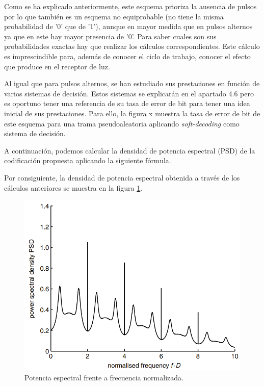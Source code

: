 Como se ha explicado anteriormente, este esquema prioriza la ausencia de pulsos por
lo que también es un esquema no equiprobable (no tiene la misma probabilidad de '0'
que de '1'), aunque en mayor medida que en pulsos
alternos ya que en este hay mayor presencia de '0'. Para saber cuales son sus 
probabilidades exactas hay que realizar los cálculos correspondientes. Este cálculo es 
imprescindible para, además de conocer el ciclo de trabajo, conocer el efecto que 
produce en el receptor de luz.

Al igual que para pulsos alternos, se han estudiado sus prestaciones en función de varios 
sistemas de decisión. Estos sistemas se explicarán en el apartado 4.6 pero es oportuno 
tener una referencia de su tasa de error de bit para tener una idea inicial de sus 
prestaciones. Para ello, la figura x muestra la tasa de error de bit de este esquema
para una trama pseudoaleatoria aplicando \textit{soft-decoding} como sistema de decisión. 

A continuación, podemos calcular la densidad de potencia espectral (PSD) de la 
codificación propuesta aplicando la siguiente fórmula.

Por consiguiente, la densidad de potencia espectral obtenida a través de los cálculos
anteriores se muestra en la figura \ref{psd_cancelación}.

\begin{figure}[ht]
    \centering
    \includegraphics[scale=0.5]{./figuras/psd_cancelacion.png}
    \caption{\small{Potencia espectral frente a frecuencia normalizada.}}
    \label{psd_cancelación}%
\end{figure}


